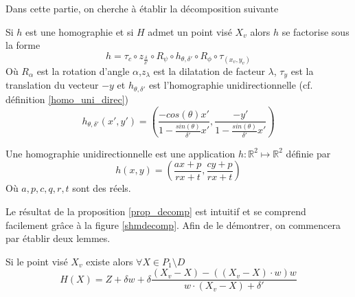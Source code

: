 Dans cette partie, on cherche à établir la décomposition suivante
\begin{prop}
Si $h$ est une homographie et si $H$ admet un point visé $X_v$ alors $h$ se factorise sous la forme
\begin{equation}
h = \tau_{c} \circ z_{\frac{\delta}{\delta'}}  \circ R_{\psi} \circ h_{\theta,\delta'} \circ R_{\phi} \circ \tau_{(x_v,y_v)}
\label{formul_decomp}
\end{equation}
Où $R_{\alpha}$ est la rotation d'angle $\alpha$,$z_\lambda$ est la dilatation de facteur $\lambda$, $\tau_y$ est  la translation du vecteur $-y$ et $h_{\theta,\delta'}$ est l'homographie unidirectionnelle (cf. définition \ref{homo_uni_direc})
\begin{equation}
h_{\theta,\delta'}(x',y')=\left(\frac{-cos(\theta)x'}{1-\frac{sin(\theta)}{\delta'}x'} ,\frac{-y'}{1-\frac{sin(\theta)}{\delta'}x'}\right)
\label{mise_perspective}
\end{equation}
\label{prop_decomp}
\end{prop}

\begin{Def}
Une homographie unidirectionnelle est une application $h:\mathbb{R}^{2} \mapsto \mathbb{R}^{2}$ définie par 
\begin{equation*}
h(x,y)=\left ( \frac{ax+p}{rx+t} , \frac{cy+p}{rx+t} \right)
\end{equation*}
Où $a,p,c,q,r,t$ sont des réels.
\label{homo_uni_direc}
\end{Def}

Le résultat de la proposition \ref{prop_decomp} est intuitif et se comprend facilement grâce à la figure \ref{shmdecomp}. Afin de le démontrer, on commencera par établir deux lemmes.

\begin{lem}Si le point visé $X_v$ existe alors
$\forall X \in P_1 \setminus D$
\begin{equation}
H(X)=Z+\delta w+\delta \frac{(X_v-X)-\left((X_v-X)\cdot w\right) w}{w\cdot (X_v-X)+\delta'}
\label{homo_form_geo}
\end{equation}
\end{lem}

